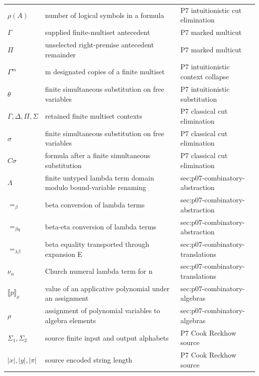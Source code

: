 \begin{longtable}{@{}p{}p{}p{}@{}}
\(\rho(A)\) & number of logical symbols in a formula & P7 intuitionistic cut elimination \\
\(\Gamma\) & supplied finite-multiset antecedent & P7 marked multicut \\
\(\Pi\) & unselected right-premise antecedent remainder & P7 marked multicut \\
\(\Gamma^m\) & m designated copies of a finite multiset & P7 intuitionistic context collapse \\
\(\theta\) & finite simultaneous substitution on free variables & P7 intuitionistic substitution \\
\(\Gamma,\allowbreak \Delta,\allowbreak \Pi,\allowbreak \Sigma\) & retained finite multiset contexts & P7 classical cut elimination \\
\(\sigma\) & finite simultaneous substitution on free variables & P7 classical cut elimination \\
\(C\sigma\) & formula after a finite simultaneous substitution & P7 classical cut elimination \\
\(\Lambda\) & finite untyped lambda term domain modulo bound-variable renaming & sec:\allowbreak{}p07-\allowbreak{}combinatory-\allowbreak{}abstraction \\
\(=_\beta\) & beta conversion of lambda terms & sec:\allowbreak{}p07-\allowbreak{}combinatory-\allowbreak{}abstraction \\
\(=_{\beta\eta}\) & beta-eta conversion of lambda terms & sec:\allowbreak{}p07-\allowbreak{}combinatory-\allowbreak{}abstraction \\
\(=_{\lambda\beta}\) & beta equality transported through expansion E & sec:\allowbreak{}p07-\allowbreak{}combinatory-\allowbreak{}translations \\
\(\nu_n\) & Church numeral lambda term for n & sec:\allowbreak{}p07-\allowbreak{}combinatory-\allowbreak{}translations \\
\(\llbracket p\rrbracket_\rho\) & value of an applicative polynomial under an assignment & sec:\allowbreak{}p07-\allowbreak{}combinatory-\allowbreak{}algebras \\
\(\rho\) & assignment of polynomial variables to algebra elements & sec:\allowbreak{}p07-\allowbreak{}combinatory-\allowbreak{}algebras \\
\(\Sigma_1,\allowbreak \Sigma_2\) & source finite input and output alphabets & P7 Cook Reckhow source \\
\(|x|,\allowbreak |y|,\allowbreak |\pi|\) & source encoded string length & P7 Cook Reckhow source \\

\end{longtable}
